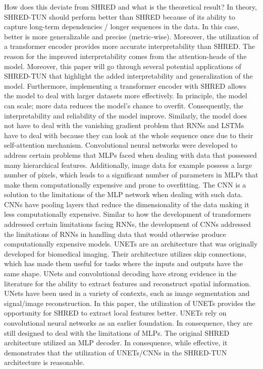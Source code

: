 \documentclass[11pt, a4paper]{article}
\begin{document}
How does this deviate from SHRED and what is the theoretical result? In theory, SHRED-TUN should
perform better than SHRED because of its ability to capture long-term dependencies / longer sequences
in the data. In this case, better is more generalizable and precise (metric-wise). Moreover, the
utilization of a transformer encoder provides more accurate interpretability than SHRED. The reason for the
improved interpretability comes from the attention-heads of the model. Moreover, this paper will go through \cite{peng2024limitationstransformerarchitecture}
several potential applications of SHRED-TUN that highlight the added interpretability and generalization
of the model. Furthermore, implementing a transformer encoder with SHRED allows the model to
deal with larger datasets more effectively. In principle, the model can scale; more data reduces the model’s
chance to overfit. Consequently, the interpretability and reliability of the model improve. Similarly, the
model does not have to deal with the vanishing gradient problem that RNNs and LSTMs have to deal with because they can look at the whole sequence once due to their self-attention mechanism.
Convolutional neural networks were developed to address certain problems that MLPs faced when dealing with
data that possessed many hierarchical features. Additionally, image data for example possess a large number of pixels, which leads to a significant number of parameters in MLPs that make them computationally
expensive and prone to overfitting. The CNN is a solution to the limitations of the MLP network when
dealing with such data. CNNs have pooling layers that reduce the dimensionality of the data making it less
computationally expensive. Similar to how the development of transformers addressed certain limitations
facing RNNs, the development of CNNs addressed the limitations of RNNs in handling data that would
otherwise produce computationally expensive models.
UNETs are an architecture that was originally developed for biomedical imaging. Their architecture
utilizes skip connections, which has made them useful for tasks where the inputs and outputs have the
same shape. UNets and convolutional decoding have strong evidence in the literature for the ability to
extract features and reconstruct spatial information. UNets have been used in a variety of contexts, such
as image segmentation and signal/image reconstruction. In this paper, the utilization of UNETs provides
the opportunity for SHRED to extract local features better. UNETs rely on convolutional neural networks
as an earlier foundation. In consequence, they are still designed to deal with the limitations of MLPs. The
original SHRED architecture utilized an MLP decoder. In consequence, while effective, it demonstrates that
the utilization of UNETs/CNNs in the SHRED-TUN architecture is reasonable.
\end{document}
